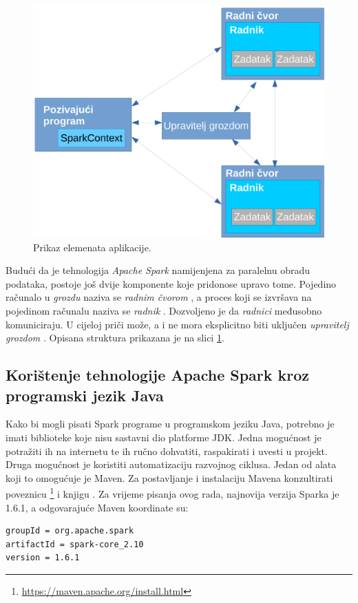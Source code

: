 \documentclass[times, utf8, zavrsni, numeric]{fer}
\begin{document}
\begin{figure}[htb]
\centering
\includegraphics[scale=0.55]{img/elementiAplikacijeCropped.pdf}
\caption{Prikaz elemenata aplikacije.}
\label{fig:cluster-overview}
\end{figure}

Budući da je tehnologija \emph{Apache Spark} namijenjena za paralelnu obradu podataka, postoje još dvije komponente koje pridonose upravo tome. Pojedino računalo u \emph{grozdu}  naziva se \emph{radnim čvorom} , a proces koji se izvršava na pojedinom računalu naziva se \emph{radnik} . Dozvoljeno je da \emph{radnici} međusobno komuniciraju. U cijeloj priči može, a i ne mora eksplicitno biti uključen \emph{upravitelj grozdom} .
Opisana struktura prikazana je na slici \ref{fig:cluster-overview}.

\subsection{Korištenje tehnologije Apache Spark kroz programski jezik Java}
Kako bi mogli pisati Spark programe u programskom jeziku Java, potrebno je imati biblioteke koje nisu sastavni dio platforme JDK.
Jedna mogućnost je potražiti ih na internetu te ih ručno dohvatiti, raspakirati i uvesti u projekt. Druga mogućnost je koristiti automatizaciju razvojnog ciklusa. Jedan od alata koji to omogućuje je Maven. Za postavljanje i instalaciju Mavena konzultirati poveznicu \footnote{\url{https://maven.apache.org/install.html}} i knjigu \cite{marcupic}. Za vrijeme pisanja ovog rada, najnovija verzija Sparka je 1.6.1, a odgovarajuće Maven koordinate su:
\begin{lstlisting}[language=bash, basicstyle=\small]
groupId = org.apache.spark
artifactId = spark-core_2.10
version = 1.6.1
\end{lstlisting}
\end{document}

